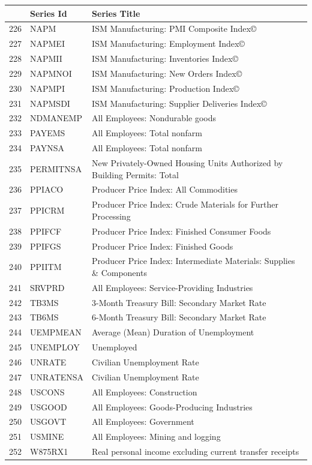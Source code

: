 \documentclass[11pt]{article}
\begin{document}
\begin{table}
\centering
\begin{tabular}{rp{5cm}p{11cm}}
	& \textbf{Series Id} & \textbf{Series Title} \\
  \hline
  \hline
	226 & NAPM & ISM Manufacturing: PMI Composite Index© \\
  \hline
	227 & NAPMEI & ISM Manufacturing: Employment Index© \\
  \hline
	228 & NAPMII & ISM Manufacturing: Inventories Index© \\
  \hline
	229 & NAPMNOI & ISM Manufacturing: New Orders Index© \\
  \hline
	230 & NAPMPI & ISM Manufacturing: Production Index© \\
  \hline
	231 & NAPMSDI & ISM Manufacturing: Supplier Deliveries Index© \\
  \hline
	232 & NDMANEMP & All Employees: Nondurable goods \\
  \hline
	233 & PAYEMS & All Employees: Total nonfarm \\
  \hline
	234 & PAYNSA & All Employees: Total nonfarm \\
  \hline
	235 & PERMITNSA & New Privately-Owned Housing Units Authorized by Building Permits: Total \\
  \hline
	236 & PPIACO & Producer Price Index: All Commodities \\
  \hline
	237 & PPICRM & Producer Price Index: Crude Materials for Further Processing \\
  \hline
	238 & PPIFCF & Producer Price Index: Finished Consumer Foods \\
  \hline
	239 & PPIFGS & Producer Price Index: Finished Goods \\
  \hline
	240 & PPIITM & Producer Price Index: Intermediate Materials: Supplies \& Components \\
  \hline
	241 & SRVPRD & All Employees: Service-Providing Industries \\
  \hline
	242 & TB3MS & 3-Month Treasury Bill: Secondary Market Rate \\
  \hline
	243 & TB6MS & 6-Month Treasury Bill: Secondary Market Rate \\
  \hline
	244 & UEMPMEAN & Average (Mean) Duration of Unemployment \\
  \hline
	245 & UNEMPLOY & Unemployed \\
  \hline
	246 & UNRATE & Civilian Unemployment Rate \\
  \hline
	247 & UNRATENSA & Civilian Unemployment Rate \\
  \hline
	248 & USCONS & All Employees: Construction \\
  \hline
	249 & USGOOD & All Employees: Goods-Producing Industries \\
  \hline
	250 & USGOVT & All Employees: Government \\
  \hline
	251 & USMINE & All Employees: Mining and logging \\
  \hline
	252 & W875RX1 & Real personal income excluding current transfer receipts \\
\end{tabular}
\end{table}





\newpage


\end{document}
